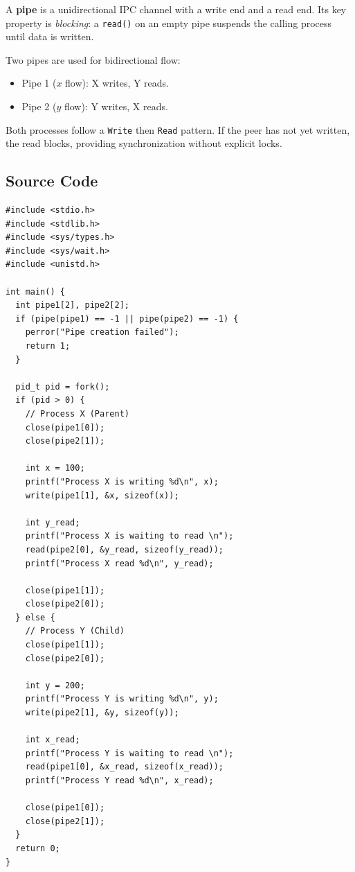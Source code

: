 \documentclass[11pt,a4paper]{article}
\begin{document}
\begin{theorybox}
A \textbf{pipe} is a unidirectional IPC channel with a write end and a read end. Its key property is \emph{blocking}: a \texttt{read()} on an empty pipe suspends the calling process until data is written.

Two pipes are used for bidirectional flow:
\begin{itemize}[nosep]
    \item Pipe 1 ($x$ flow): X writes, Y reads.
    \item Pipe 2 ($y$ flow): Y writes, X reads.
\end{itemize}

Both processes follow a \texttt{Write} then \texttt{Read} pattern. If the peer has not yet written, the read blocks, providing synchronization without explicit locks.
\end{theorybox}

\subsection*{Source Code}
\begin{codebox}
\begin{lstlisting}[style=cstyle]
#include <stdio.h>
#include <stdlib.h>
#include <sys/types.h>
#include <sys/wait.h>
#include <unistd.h>

int main() {
  int pipe1[2], pipe2[2];
  if (pipe(pipe1) == -1 || pipe(pipe2) == -1) {
    perror("Pipe creation failed");
    return 1;
  }

  pid_t pid = fork();
  if (pid > 0) {
    // Process X (Parent)
    close(pipe1[0]);
    close(pipe2[1]);

    int x = 100;
    printf("Process X is writing %d\n", x);
    write(pipe1[1], &x, sizeof(x));

    int y_read;
    printf("Process X is waiting to read \n");
    read(pipe2[0], &y_read, sizeof(y_read));
    printf("Process X read %d\n", y_read);

    close(pipe1[1]);
    close(pipe2[0]);
  } else {
    // Process Y (Child)
    close(pipe1[1]);
    close(pipe2[0]);

    int y = 200;
    printf("Process Y is writing %d\n", y);
    write(pipe2[1], &y, sizeof(y));

    int x_read;
    printf("Process Y is waiting to read \n");
    read(pipe1[0], &x_read, sizeof(x_read));
    printf("Process Y read %d\n", x_read);

    close(pipe1[0]);
    close(pipe2[1]);
  }
  return 0;
}
\end{lstlisting}
\end{codebox}
\end{document}
